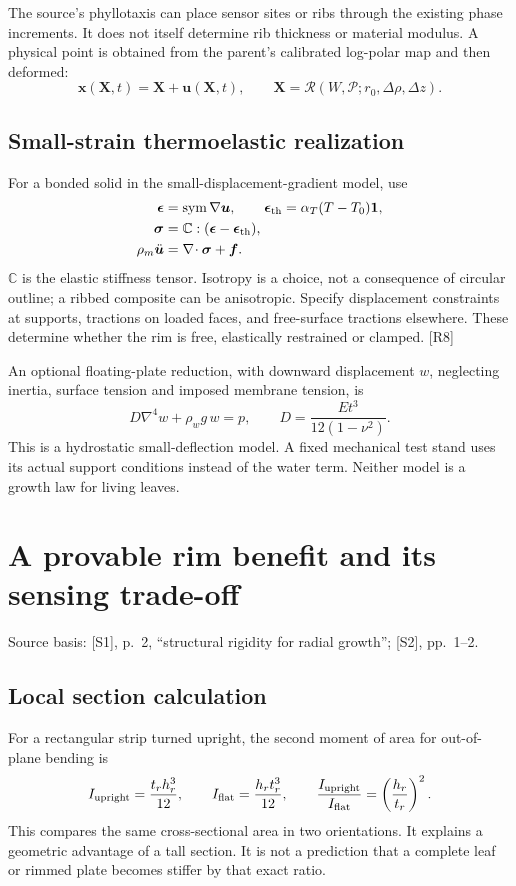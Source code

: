 \documentclass[10pt,a4paper]{article}
\numberwithin{equation}{section}
\newcommand{\src}[1]{\textcolor{muted}{\footnotesize Source basis: #1.}}
\newcommand{\newpart}{\clearpage}
\DeclareMathOperator{\sym}{sym}
\begin{document}
The source's phyllotaxis can place sensor sites or ribs through the existing phase increments. It does not itself determine rib thickness or material modulus. A physical point is obtained from the parent's calibrated log-polar map and then deformed:
\begin{equation}
\bm x(\bm X,t)=\bm X+\bm u(\bm X,t),\qquad
\bm X=\mathcal R(W,\mathcal P;r_0,\Delta\rho,\Delta z).
\end{equation}

\subsection*{Small-strain thermoelastic realization}
For a bonded solid in the small-displacement-gradient model, use
\begin{align}
\bm\epsilon&=\sym\nabla\bm u,\qquad
\bm\epsilon_{\rm th}=\alpha_T(T-T_0)\bm 1,\\
\bm\sigma&=\mathbb C:(\bm\epsilon-\bm\epsilon_{\rm th}),\\
\rho_m\ddot{\bm u}&=\nabla\!\cdot\bm\sigma+\bm f .
\end{align}
$\mathbb C$ is the elastic stiffness tensor. Isotropy is a choice, not a consequence of circular outline; a ribbed composite can be anisotropic. Specify displacement constraints at supports, tractions on loaded faces, and free-surface tractions elsewhere. These determine whether the rim is free, elastically restrained or clamped. [R8]

An optional floating-plate reduction, with downward displacement $w$, neglecting inertia, surface tension and imposed membrane tension, is
\begin{equation}
D\nabla^4w+\rho_w g\,w=p,\qquad D=\frac{Et^3}{12(1-\nu^2)}.
\end{equation}
This is a hydrostatic small-deflection model. A fixed mechanical test stand uses its actual support conditions instead of the water term. Neither model is a growth law for living leaves.

\newpart
\section{A provable rim benefit and its sensing trade-off}
\label{sec:rimproof}
\src{[S1], p.~2, ``structural rigidity for radial growth''; [S2], pp.~1--2}

\subsection*{Local section calculation}
For a rectangular strip turned upright, the second moment of area for out-of-plane bending is
\begin{equation}
I_{\rm upright}=\frac{t_rh_r^3}{12},\qquad
I_{\rm flat}=\frac{h_rt_r^3}{12},\qquad
\frac{I_{\rm upright}}{I_{\rm flat}}=\left(\frac{h_r}{t_r}\right)^2.
\end{equation}
This compares the same cross-sectional area in two orientations. It explains a geometric advantage of a tall section. It is not a prediction that a complete leaf or rimmed plate becomes stiffer by that exact ratio.
\end{document}
